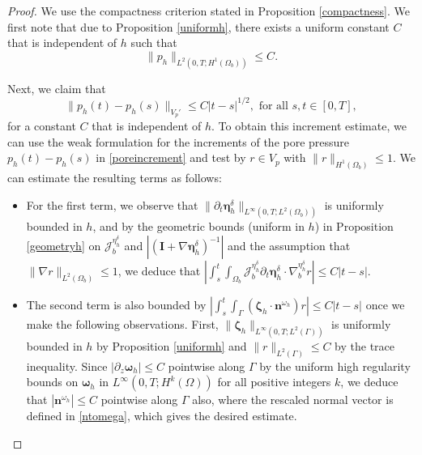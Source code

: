 \documentclass[11pt]{article}
\newcommand{\bd}{\boldsymbol}
\theoremstyle{definition}
\begin{document}
\begin{proof}
We use the compactness criterion stated in Proposition \ref{compactness}. We first note that due to Proposition \ref{uniformh}, there exists a uniform constant $C$ that is independent of $h$ such that
\begin{equation*}
\|p_{h}\|_{L^{2}(0, T; H^{1}(\Omega_{b}))} \le C.
\end{equation*}

Next, we claim that 
\begin{equation}\label{incrementph}
\|p_{h}(t) - p_{h}(s)\|_{V_{p}'} \le C|t - s|^{1/2}, \text{ for all $s, t \in [0, T]$},
\end{equation}
for a constant $C$ that is independent of $h$. To obtain this increment estimate, we can use the weak formulation for the increments of the pore pressure $p_{h}(t) - p_{h}(s)$ in \eqref{poreincrement} and test by $r \in V_{p}$ with $\|r\|_{H^{1}(\Omega_{b})} \le 1$. We can estimate the resulting terms as follows:
\begin{itemize}
\item For the first term, we observe that $\|\partial_{t}\bd{\eta}^{\delta}_{h}\|_{L^{\infty}(0, T; L^{2}(\Omega_{b}))}$ is uniformly bounded in $h$, and by the geometric bounds (uniform in $h$) in Proposition \ref{geometryh} on $\mathcal{J}^{\eta^{\delta}_{h}}_{b}$ and $|(\bd{I} + \nabla \bd{\eta}^{\delta}_{h})^{-1}|$ and the assumption that $\|\nabla r\|_{L^{2}(\Omega_{b})} \le 1$, we deduce that $\displaystyle \left|\int_{s}^{t} \int_{\Omega_{b}} \mathcal{J}^{\eta^{\delta}_{h}}_{b} \partial_{t} \bd{\eta}^{\delta}_{h} \cdot \nabla^{\eta^{\delta}_{h}}_{b} r\right| \le C|t - s|$. 

\item The second term is also bounded by $\displaystyle \left|\int_{s}^{t} \int_{\Gamma} (\bd{\zeta}_{h} \cdot \bd{n}^{\omega_{h}}) r\right| \le C|t - s|$ once we make the following observations. First, $\|\bd{\zeta}_{h}\|_{L^{\infty}(0, T; L^{2}(\Gamma))}$ is uniformly bounded in $h$ by Proposition \ref{uniformh} and $\|r\|_{L^{2}(\Gamma)} \le C$ by the trace inequality. Since $|\partial_{z}\bd{\omega}_{h}| \le C$ pointwise along $\Gamma$ by the uniform high regularity bounds on $\bd{\omega}_{h}$ in $L^{\infty}(0, T; H^{k}(\Omega))$ for all positive integers $k$, we deduce that $|\bd{n}^{\omega_{h}}| \le C$ pointwise along $\Gamma$ also, where the rescaled normal vector is defined in \eqref{ntomega}, which gives the desired estimate. 


\end{itemize}
\end{proof}
\end{document}
